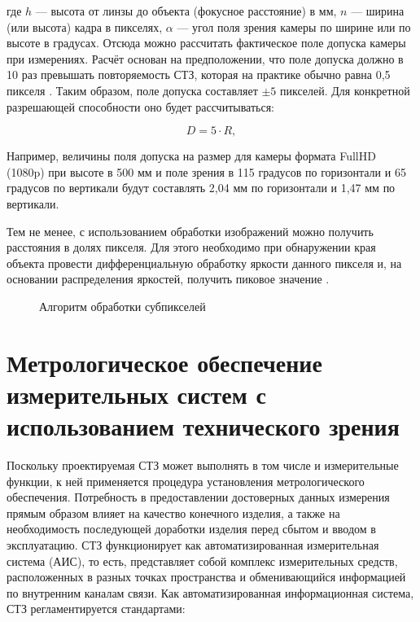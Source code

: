 где $h$ --- высота от линзы до объекта (фокусное расстояние) в мм, $n$ --- ширина (или высота) кадра в пикселях, $\alpha$ --- угол поля зрения камеры по ширине или по высоте в градусах. Отсюда можно рассчитать фактическое поле допуска камеры при измерениях. Расчёт основан на предположении, что поле допуска должно в 10 раз превышать повторяемость СТЗ, которая на практике обычно равна 0,5 пикселя \cite{Nello2000}. Таким образом, поле допуска составляет $\pm5$ пикселей. Для конкретной разрешающей способности оно будет рассчитываться:

\begin{equation}
D = 5 \cdot R,
\label{eq_3_26}
\end{equation}

Например, величины поля допуска на размер для камеры формата FullHD (1080p) при высоте в 500 мм и поле зрения в 115 градусов по горизонтали и 65 градусов по вертикали будут составлять 2,04 мм по горизонтали и 1,47 мм по вертикали.

Тем не менее, с использованием обработки изображений можно получить расстояния в долях пикселя. Для этого необходимо при обнаружении края объекта провести дифференциальную обработку яркости данного пикселя и, на основании распределения яркостей, получить пиковое значение \cite{fig:subpixel-count} \cite{web:dimention}.

\begin{figure}[ht]
	\caption{Алгоритм обработки субпикселей}\label{fig:subpixel-count}
\end{figure}

\section{Метрологическое обеспечение измерительных систем с использованием технического зрения} \label{sect3_4}

Поскольку проектируемая СТЗ может выполнять в том числе и измерительные функции, к ней применяется процедура установления метрологического обеспечения. Потребность в предоставлении достоверных данных измерения прямым образом влияет на качество конечного изделия, а также на необходимость последующей доработки изделия перед сбытом и вводом в эксплуатацию. СТЗ функционирует как автоматизированная измерительная система (АИС), то есть, представляет собой комплекс измерительных средств, расположенных в разных точках пространства и обменивающийся информацией по внутренним каналам связи. Как автоматизированная информационная система, СТЗ регламентируется стандартами:

